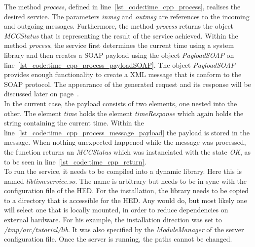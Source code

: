 The method \textit{process}, defined in line~\ref{lst_code:time_cpp_process}, realises the desired service. 
The parameters \textit{inmsg} and \textit{outmsg} are references to the incoming and outgoing messages.
Furthermore, the method \textit{process} returns the object \textit{MCCStatus} that is representing the result of the service achieved. 
Within the method \textit{process}, the service first determines the current time using a system library and then creates a SOAP payload using the object \textit{PayloadSOAP} on line~\ref{lst_code:time_cpp_process_payloadSOAP}. 
The object \textit{PayloadSOAP} provides enough functionality to create a XML message that is conform to the SOAP protocol.
The appearance of the generated request and its response will be discussed later on page~\pageref{lst:time_client_request}.\\


In the current case, the payload consists of two elements, one nested into the other.
The element \textit{time} holds the element \textit{timeResponse} which again holds the string containing the current time.
Within the line~\ref{lst_code:time_cpp_process_message_payload} the payload is stored in the message. 
When nothing unexpected happened while the message was processed, the function returns an \textit{MCCStatus} which was instanciated with the state \textit{OK}, as to be seen in line~\ref{lst_code:time_cpp_return}.\\



To run the service, it needs to be compiled into a dynamic library. Here this is named \textit{libtimeservice.so}. The name is arbitrary but needs to be in sync with the configuration file of the HED.
For the installation, the library needs to be copied to a directory that is accessible for the HED. Any would do, but most likely one will select one that is locally mounted, in order to reduce dependencies on external hardware. For his example, the installation direction was set to \textit{/tmp/arc/tutorial/lib}. It was also specified by the \textit{ModuleManager} of the server configuration file. 
Once the server is running, the paths cannot be changed.\\


